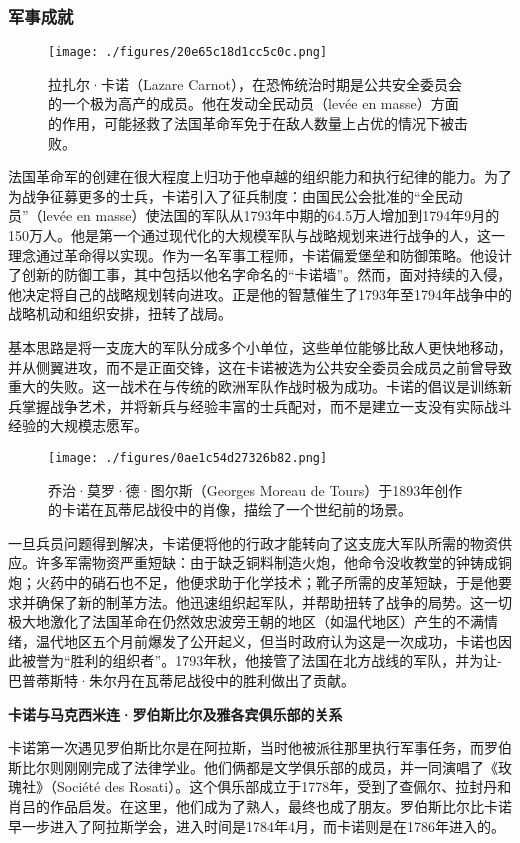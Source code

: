 \subsubsection{军事成就}
\begin{figure}[ht]
\centering
\texttt{[image: ./figures/20e65c18d1cc5c0c.png]}
\caption{拉扎尔·卡诺（Lazare Carnot），在恐怖统治时期是公共安全委员会的一个极为高产的成员。他在发动全民动员（levée en masse）方面的作用，可能拯救了法国革命军免于在敌人数量上占优的情况下被击败。} \label{fig_Lazare_2}
\end{figure}
法国革命军的创建在很大程度上归功于他卓越的组织能力和执行纪律的能力。为了为战争征募更多的士兵，卡诺引入了征兵制度：由国民公会批准的“全民动员”（levée en masse）使法国的军队从1793年中期的64.5万人增加到1794年9月的150万人。他是第一个通过现代化的大规模军队与战略规划来进行战争的人，这一理念通过革命得以实现。作为一名军事工程师，卡诺偏爱堡垒和防御策略。他设计了创新的防御工事，其中包括以他名字命名的“卡诺墙”。然而，面对持续的入侵，他决定将自己的战略规划转向进攻。正是他的智慧催生了1793年至1794年战争中的战略机动和组织安排，扭转了战局。

基本思路是将一支庞大的军队分成多个小单位，这些单位能够比敌人更快地移动，并从侧翼进攻，而不是正面交锋，这在卡诺被选为公共安全委员会成员之前曾导致重大的失败。这一战术在与传统的欧洲军队作战时极为成功。卡诺的倡议是训练新兵掌握战争艺术，并将新兵与经验丰富的士兵配对，而不是建立一支没有实际战斗经验的大规模志愿军。
\begin{figure}[ht]
\centering
\texttt{[image: ./figures/0ae1c54d27326b82.png]}
\caption{乔治·莫罗·德·图尔斯（Georges Moreau de Tours）于1893年创作的卡诺在瓦蒂尼战役中的肖像，描绘了一个世纪前的场景。} \label{fig_Lazare_3}
\end{figure}
一旦兵员问题得到解决，卡诺便将他的行政才能转向了这支庞大军队所需的物资供应。许多军需物资严重短缺：由于缺乏铜料制造火炮，他命令没收教堂的钟铸成铜炮；火药中的硝石也不足，他便求助于化学技术；靴子所需的皮革短缺，于是他要求并确保了新的制革方法。他迅速组织起军队，并帮助扭转了战争的局势。这一切极大地激化了法国革命在仍然效忠波旁王朝的地区（如温代地区）产生的不满情绪，温代地区五个月前爆发了公开起义，但当时政府认为这是一次成功，卡诺也因此被誉为“胜利的组织者”。1793年秋，他接管了法国在北方战线的军队，并为让-巴普蒂斯特·朱尔丹在瓦蒂尼战役中的胜利做出了贡献。

\textbf{卡诺与马克西米连·罗伯斯比尔及雅各宾俱乐部的关系 } 

卡诺第一次遇见罗伯斯比尔是在阿拉斯，当时他被派往那里执行军事任务，而罗伯斯比尔则刚刚完成了法律学业。他们俩都是文学俱乐部的成员，并一同演唱了《玫瑰社》（Société des Rosati）。这个俱乐部成立于1778年，受到了查佩尔、拉封丹和肖吕的作品启发。在这里，他们成为了熟人，最终也成了朋友。罗伯斯比尔比卡诺早一步进入了阿拉斯学会，进入时间是1784年4月，而卡诺则是在1786年进入的。

